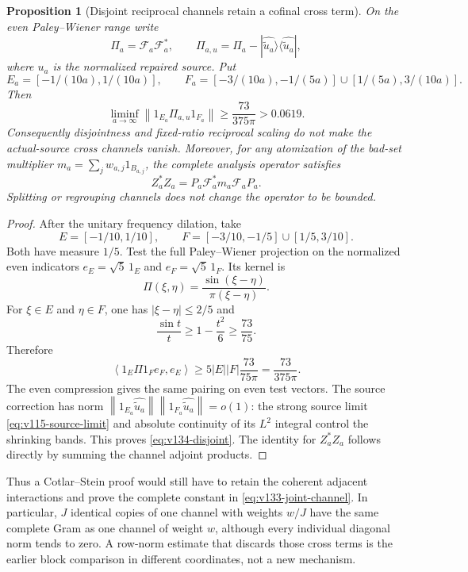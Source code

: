 \documentclass[11pt]{article}
\newtheorem{proposition}[theorem]{Proposition}
\theoremstyle{remark}
\newcommand{\norm}[1]{\left\lVert #1\right\rVert}
\newcommand{\ip}[2]{\left\langle #1,#2\right\rangle}
\begin{document}
\begin{proposition}[Disjoint reciprocal channels retain a cofinal cross term]
\label{prop:v134-disjoint}
On the even Paley--Wiener range write
\[
 \Pi_a=\mathcal F_a\mathcal F_a^*,\qquad
 \Pi_{a,u}=\Pi_a-|\widehat{\widetilde u_a}\rangle
                    \langle\widehat{\widetilde u_a}|,
\]
where $u_a$ is the normalized repaired source.  Put
\[
 E_a=[-1/(10a),1/(10a)],\qquad
 F_a=[-3/(10a),-1/(5a)]\cup[1/(5a),3/(10a)].
\]
Then
\begin{equation}
 \liminf_{a\to\infty}
 \norm{1_{E_a}\Pi_{a,u}1_{F_a}}
 \ge \frac{73}{375\pi}>0.0619.                 \label{eq:v134-disjoint}
\end{equation}
Consequently disjointness and fixed-ratio reciprocal scaling do not
make the actual-source cross channels vanish.  Moreover, for any
atomization of the bad-set multiplier
$m_a=\sum_jw_{a,j}1_{B_{a,j}}$, the complete analysis operator satisfies
\[
 Z_a^*Z_a=P_a\mathcal F_a^*m_a\mathcal F_aP_a.
\]
Splitting or regrouping channels does not change the operator to be
bounded.
\end{proposition}
\begin{proof}
After the unitary frequency dilation, take
\[
 E=[-1/10,1/10],\qquad
 F=[-3/10,-1/5]\cup[1/5,3/10].
\]
Both have measure $1/5$.  Test the full Paley--Wiener projection on the
normalized even indicators $e_E=\sqrt5\,1_E$ and
$e_F=\sqrt5\,1_F$.  Its kernel is
\[
 \Pi(\xi,\eta)=\frac{\sin(\xi-\eta)}{\pi(\xi-\eta)}.
\]
For $\xi\in E$ and $\eta\in F$, one has
$|\xi-\eta|\le2/5$ and
\[
 \frac{\sin t}{t}\ge1-\frac{t^2}{6}\ge\frac{73}{75}.
\]
Therefore
\[
 \ip{1_E\Pi1_Fe_F}{e_E}
 \ge 5|E||F|\frac{73}{75\pi}
 =\frac{73}{375\pi}.
\]
The even compression gives the same pairing on even test vectors.
The source correction has norm
$\norm{1_{E_a}\widehat{\widetilde u_a}}
 \norm{1_{F_a}\widehat{\widetilde u_a}}=o(1)$:
the strong source limit \eqref{eq:v115-source-limit} and absolute
continuity of its $L^2$ integral control the shrinking bands.  This
proves \eqref{eq:v134-disjoint}.  The identity for $Z_a^*Z_a$ follows
directly by summing the channel adjoint products.
\end{proof}

Thus a Cotlar--Stein proof would still have to retain the coherent
adjacent interactions and prove the complete constant in
\eqref{eq:v133-joint-channel}.  In particular, $J$ identical copies of
one channel with weights $w/J$ have the same complete Gram as one
channel of weight $w$, although every individual diagonal norm tends
to zero.  A row-norm estimate that discards those cross terms is the
earlier block comparison in different coordinates, not a new
mechanism.
\end{document}

